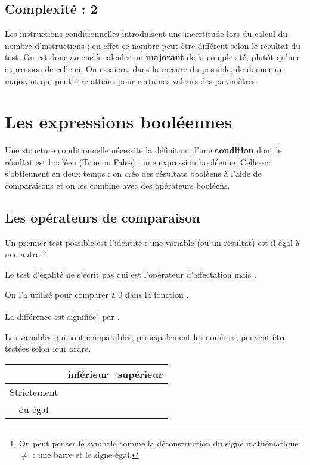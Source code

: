 \subsection{Complexité : 2}
Les instructions conditionnelles introduisent une incertitude lors du calcul du nombre d'instructions ; en effet ce nombre peut être différent selon le résultat du test. On est donc amené à calculer un {\bf majorant} de la complexité, plutôt qu'une expression de celle-ci. On essaiera, dans la mesure du possible, de donner un majorant qui peut être atteint pour certaines valeurs des paramètres.
\newpage
\section{Les expressions booléennes}
Une structure conditionnelle nécessite la définition d'une \textbf{condition} dont le résultat est booléen (True ou False) : une expression booléenne. Celles-ci s'obtiennent en deux temps : on crée des résultats booléens à l'aide de comparaisons et on les combine avec des opérateurs booléens.
\subsection{Les opérateurs de comparaison}
Un premier test possible est l'identité : une variable (ou un résultat) est-il égal à une autre ?

Le test d'égalité ne s'écrit pas \type{=} qui est l'opérateur d'affectation mais \Type{==}.

On l'a utilisé pour comparer à 0 dans la fonction .

La différence est signifiée\footnote{On peut penser le symbole comme la déconstruction du signe mathématique $\ne$ : une barre et le signe égal.} par \Type{!=}.

\medskip

Les variables qui sont comparables, principalement les nombres, peuvent être testées selon leur ordre.
\begin{center}
\begin{tabular}{c|cc}
 &inférieur& supérieur \\
 \hline
 Strictement  & \Type{<}&\Type{>} \\
ou égal & \Type{<=}&\Type{<=} \\
\end{tabular}
\end{center}
